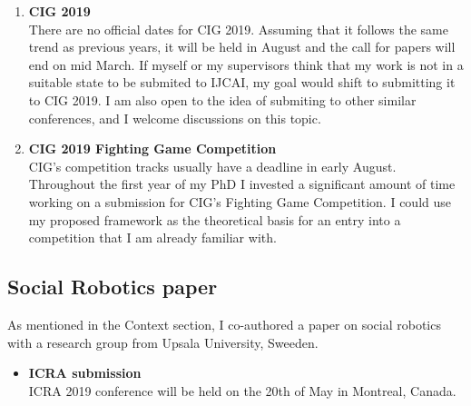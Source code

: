 \documentclass{article}
\begin{document}
\begin{enumerate}
    \item \textbf{CIG 2019} \\
        There are no official dates for CIG 2019. Assuming that it follows the same trend as previous years, it will be held in August and the call for papers will end on mid March. If myself or my supervisors think that my work is not in a suitable state to be submited to IJCAI, my goal would shift to submitting it to CIG 2019. I am also open to the idea of submiting to other similar conferences, and I welcome discussions on this topic.
    \item \textbf{CIG 2019 Fighting Game Competition} \\
       CIG's competition tracks usually have a deadline in early August. Throughout the first year of my PhD I invested a significant amount of time working on a submission for CIG's Fighting Game Competition. I could use my proposed framework as the theoretical basis for an entry into a competition that I am already familiar with.
\end{enumerate}

\subsection{Social Robotics paper}
As mentioned in the Context section, I co-authored a paper on social robotics with a research group from Upsala University, Sweeden.

\begin{itemize}
    \item \textbf{ICRA submission} \\
        ICRA 2019 conference will be held on the 20th of May in Montreal, Canada.
\end{itemize}
\end{document}
